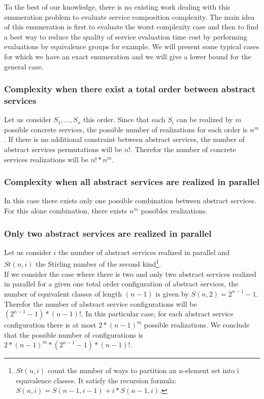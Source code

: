 \documentclass[10pt,journal,compsoc]{IEEEtran}
\begin{document}
To the best of our knowledge, there is no existing work dealing with this enumeration problem to evaluate service composition complexity. The main idea of this enumeration is first to evaluate the worst complexity case and then to find a best way to reduce the quality of service evaluation time cost by performing evaluations by equivalence groups for example.  We will present some typical  cases for which we have an exact enumeration and we will give a lower bound for the general case.

\subsubsection{Complexity when there exist a total order between abstract services}
Let us consider $S_1,\dots, S_n$ this order.  Since that each $S_i$ can be realized by $m$ possible concrete services, the possible number of realizations for each order is $n^m$. If there is no additional constraint between abstract services, the number of abstract services permutations will be $n!$. Therefor the  number of  concrete services realizations will be $n!*n^m$.

\subsubsection{Complexity when all abstract services are realized in parallel}
In this case there exists only one possible combination between abstract services. For this alone combination, there exists  $n^m$ possibles realizations. 

\subsubsection{Only two abstract services are realized in parallel}
Let us consider $i$ the number of abstract services realized in parallel and $St(n,i)%
$ the Stirling number of the second kind\footnote{$St(n,i)$ count the number of ways to partition an n-element set into i equivalence classes. It satisfy the recursion formula: $S(n,i)= S(n-1,i-1)+i*S(n-1,i)$.}. \\
If we consider the case where there is two and only two abstract services realized in parallel for a given one total order configuration of abstract services, the number of equivalent classes of length $(n-1)$ is given by $S(n,2)=2^{n-1}-1$. %
 Therefor the number of abstract service configurations will be $(2^{n-1}-1)*(n-1)!$. In this particular case, for each abstract service configuration there is at most $2*(n-1)^m$ possible realizations. We conclude that the possible number of configurations is $2*(n-1)^m*(2^{n-1}-1)*(n-1)!$.
\end{document}

